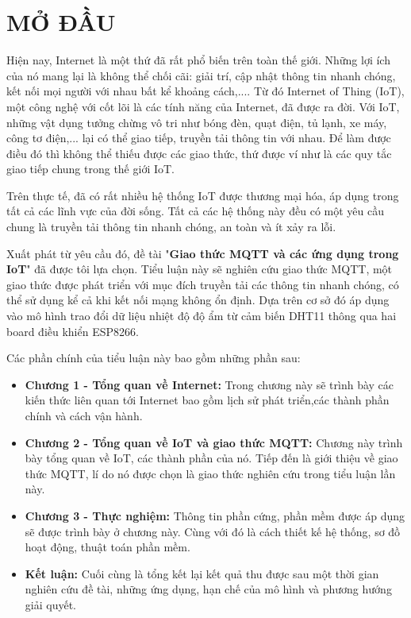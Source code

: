 
\chapter*{MỞ ĐẦU} %

\label{Chapter0} %

Hiện nay, Internet là một thứ đã rất phổ biến trên toàn thế giới. Những lợi ích của nó mang lại là không thể chối cãi: giải trí, cập nhật thông tin nhanh chóng, kết nối mọi người với nhau bất kể khoảng cách,.... Từ đó Internet of Thing (IoT), một công nghệ với cốt lõi là các tính năng của Internet, đã được ra đời. Với IoT, những vật dụng tưởng chừng vô tri như bóng đèn, quạt điện, tủ lạnh, xe máy, công tơ điện,... lại có thể giao tiếp, truyền tải thông tin với nhau. Để làm được điều đó thì không thể thiếu được các giao thức, thứ được ví như là các quy tắc giao tiếp chung trong thế giới IoT. 

Trên thực tế, đã có rất nhiều hệ thống IoT được thương mại hóa, áp dụng trong tất cả các lĩnh vực của đời sống. Tất cả các hệ thống này đều có một yêu cầu chung là truyền tải thông tin nhanh chóng, an toàn và ít xảy ra lỗi.

Xuất phát từ yêu cầu đó, đề tài "\textbf{Giao thức MQTT và các ứng dụng trong IoT}" đã được tôi lựa chọn. Tiểu luận này sẽ nghiên cứu giao thức MQTT, một giao thức được phát triển với mục đích truyền tải các thông tin nhanh chóng, có thể sử dụng kể cả khi kết nối mạng không ổn định. Dựa trên cơ sở đó áp dụng vào mô hình trao đổi dữ liệu nhiệt độ độ ẩm từ cảm biến DHT11 thông qua hai board điều khiển ESP8266.

Các phần chính của tiểu luận này bao gồm những phần sau:
\begin{itemize}
	\item {\textbf{Chương 1 - Tổng quan về Internet:}}
	Trong chương này sẽ trình bày các kiến thức liên quan tới Internet bao gồm lịch sử phát triển,các thành phần chính và cách vận hành.
	\item {\textbf{Chương 2 - Tổng quan về IoT và giao thức MQTT:}}
	Chương này trình bày tổng quan về IoT, các thành phần của nó. Tiếp đến là giới thiệu về giao thức MQTT, lí do nó được chọn là giao thức nghiên cứu trong tiểu luận lần này.
	\item {\textbf{Chương 3 - Thực nghiệm:}}
	Thông tin phần cứng, phần mềm được áp dụng sẽ được trình bày ở chương này. Cùng với đó là cách thiết kế hệ thống, sơ đồ hoạt động, thuật toán phần mềm.
	\item {\textbf{Kết luận:}}
	Cuối cùng là tổng kết lại kết quả thu được sau một thời gian nghiên cứu đề tài, những ứng dụng, hạn chế của mô hình và phương hướng giải quyết.
\end{itemize}